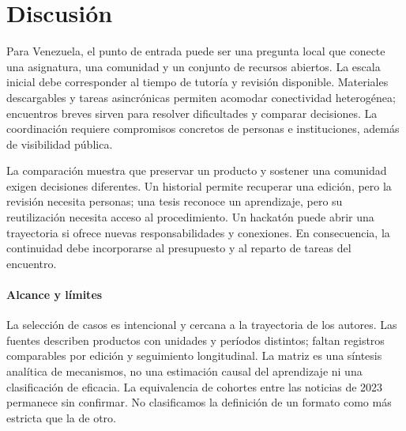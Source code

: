\section{Discusión}
Para Venezuela, el punto de entrada puede ser una pregunta local que conecte una asignatura, una comunidad y un conjunto de recursos abiertos. La escala inicial debe corresponder al tiempo de tutoría y revisión disponible. Materiales descargables y tareas asincrónicas permiten acomodar conectividad heterogénea; encuentros breves sirven para resolver dificultades y comparar decisiones. La coordinación requiere compromisos concretos de personas e instituciones, además de visibilidad pública.

La comparación muestra que preservar un producto y sostener una comunidad exigen decisiones diferentes. Un historial permite recuperar una edición, pero la revisión necesita personas; una tesis reconoce un aprendizaje, pero su reutilización necesita acceso al procedimiento. Un hackatón puede abrir una trayectoria si ofrece nuevas responsabilidades y conexiones. En consecuencia, la continuidad debe incorporarse al presupuesto y al reparto de tareas del encuentro.

\paragraph{Alcance y límites} La selección de casos es intencional y cercana a la trayectoria de los autores. Las fuentes describen productos con unidades y períodos distintos; faltan registros comparables por edición y seguimiento longitudinal. La matriz es una síntesis analítica de mecanismos, no una estimación causal del aprendizaje ni una clasificación de eficacia. La equivalencia de cohortes entre las noticias de 2023 permanece sin confirmar. No clasificamos la definición de un formato como más estricta que la de otro.

